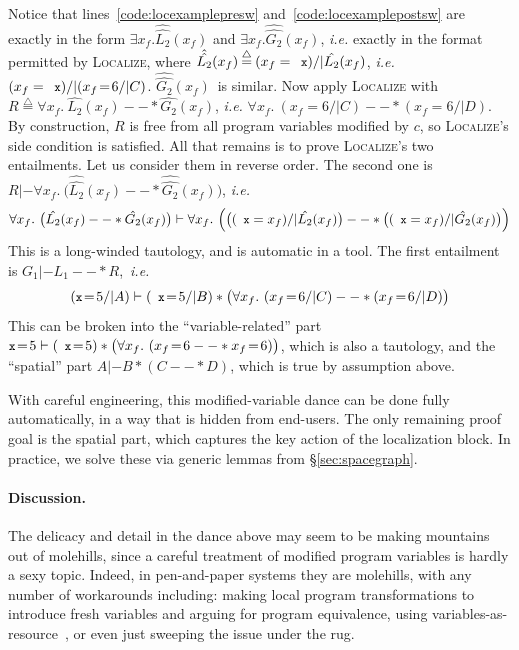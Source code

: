 \documentclass[acmsmall,screen]{acmart}
\newcommand{\li}[1]{{\texttt{\small #1}}}
\newcommand{\defeq}{\mathbin{\stackrel{\triangle}{=}}}
\begin{document}
Notice that lines~\ref{code:locexamplepresw} and~\ref{code:locexamplepostsw}
are exactly in the form $\exists x_f. \hat{\hat{L_2}}(x_f)$ and $\exists x_f. \hat{\hat{G_2}}(x_f)$, \emph{i.e.} exactly in the format permitted by \textsc{Localize}, where $\hat{\hat{L_2}}(x_f) \defeq (x_f = \li{x}) /| \hat{L_2}(x_f)$, \emph{i.e.} $(x_f = \li{x}) /| (x_f \! = \! 6 /| C)$. $\hat{\hat{G_2}}(x_f)$~is similar. Now apply \textsc{Localize} with $R \defeq \forall x_f.~\hat{L_2}(x_f) --* \hat{G_2}(x_f)$, \emph{i.e.} $\forall x_f.~(x_f \! = \! 6 /| C) --* (x_f \! = \! 6 /| D)$.  By construction, $R$
is free from all program variables modified by $c$, so \textsc{Localize}'s side condition is
satisfied.  All that remains is to prove \textsc{Localize}'s two entailments.  Let us consider
them in reverse order.  The second one is $R |- \forall x_f.~ \big(\hat{\hat{L_2}}(x_f) --* \hat{\hat{G_2}}(x_f)\big)$, \emph{i.e.}
\[
\forall x_f.~\big(\hat{L_2}(x_f) --* \hat{G_2}(x_f)\big) |- \forall x_f.~\Big(\big((\li{x} = x_f) /| \hat{L_2}(x_f)\big) --* \big((\li{x} = x_f) /| \hat{G_2}(x_f)\big)\Big)
\]
This is a long-winded tautology, and is automatic in a tool.
The first entailment is $G_1 |- L_1 --* R$,~\emph{i.e.}
\[
(\li{x} \! = \! 5 /| A) |- (\li{x} \! = \! 5 /| B) * \big(\forall x_f.~ (x_f \! = \! 6 /| C) --* (x_f \! = \! 6 /| D) \big)
\]
This can be broken into the ``variable-related'' part $\li{x} \! = \! 5 |- (\li{x} \! = \! 5) * \big(\forall x_f.~ (x_f \! = \! 6 --* x_f \! = \! 6)\big)$, which is also a tautology, and the ``spatial'' part $A |- B * (C --* D)$, which is true by assumption above.

With careful engineering, this modified-variable dance 
can be done fully automatically, in a way that is hidden from end-users.  
The only remaining proof
goal is the spatial part, which captures the key action of the localization block.  
In practice, we solve these via generic lemmas from \S\ref{sec:spacegraph}.

\paragraph{Discussion.} The delicacy and detail in the dance above may seem to be making
mountains out of molehills, since a careful treatment of modified program variables is
hardly a sexy topic.  Indeed, in pen-and-paper systems they are molehills, with any
number of workarounds including: making local program transformations to introduce
fresh variables and arguing for program equivalence, using
variables-as-resource~\cite{bornat:var}, or even just sweeping the issue under the rug.
\end{document}
